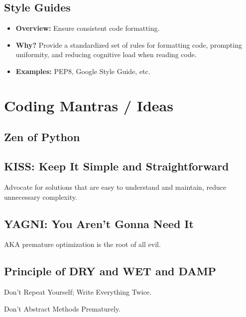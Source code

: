 \subsection{Style Guides}
\begin{notes}
    \begin{itemize}
        \item \textbf{Overview:} Ensure consistent code formatting. 
        \item \textbf{Why?} Provide a standardized set of rules for formatting code, prompting uniformity, and reducing cognitive load when reading code. 
        \item \textbf{Examples:} PEP8, Google Style Guide, etc.
    \end{itemize}
\end{notes}
\newpage

\section{Coding Mantras / Ideas}
\subsection{Zen of Python}
\begin{definition}
\end{definition}

\subsection{KISS: Keep It Simple and Straightforward}
\begin{notes}
    Advocate for solutions that are easy to understand and maintain, reduce unnecessary complexity.
\end{notes}

\subsection{YAGNI: You Aren't Gonna Need It}
\begin{notes}
    AKA premature optimization is the root of all evil. 
\end{notes}

\subsection{Principle of DRY and WET and DAMP}
\begin{notes}
    Don't Repeat Yourself; Write Everything Twice.
    \vspace{1em}

    Don't Abstract Methods Prematurely.
\end{notes}
\newpage

